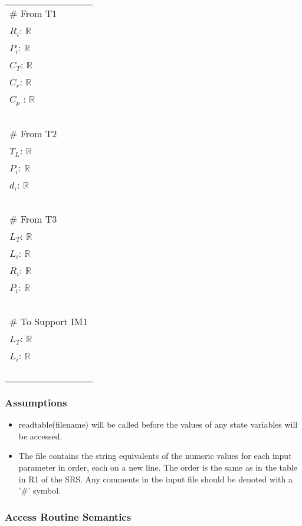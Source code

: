 \documentclass[12pt, titlepage]{article}
\begin{document}
\renewcommand{\arraystretch}{1.2}
\begin{longtable*}[l]{l} 
\# From T1\\
$R_i$: $\mathbb{R}$ \\
$P_i$: $\mathbb{R}$ \\
$C_T$: $\mathbb{R}$ \\
$C_r$: $\mathbb{R}$ \\
$C_p$ : $\mathbb{R}$ \\
~\\
\# From T2\\
$T_L$: $\mathbb{R}$ \\
$P_i$: $\mathbb{R}$ \\
$d_i$: $\mathbb{R}$ \\
~\\
\noindent \# From T3\\
$L_T$: $\mathbb{R}$ \\
$L_i$: $\mathbb{R}$ \\
$R_i$: $\mathbb{R}$ \\
$P_i$: $\mathbb{R}$ \\
~\\
\# To Support IM1\\
$L_T$: $\mathbb{R}$ \\
$L_i$: $\mathbb{R}$ \\ 
~\\

\end{longtable*}

\subsubsection{Assumptions}

\begin{itemize}

\item readtable(filename) will be called before the values of any state variables will be accessed.

\item The file contains the string equivalents of the numeric values for
each input parameter in order, each on a new line. The order is the same as in
the table in R1 of the SRS. Any comments in the input file should be denoted
with a '\#' symbol.

\end{itemize}

\subsubsection{Access Routine Semantics}
\end{document}
